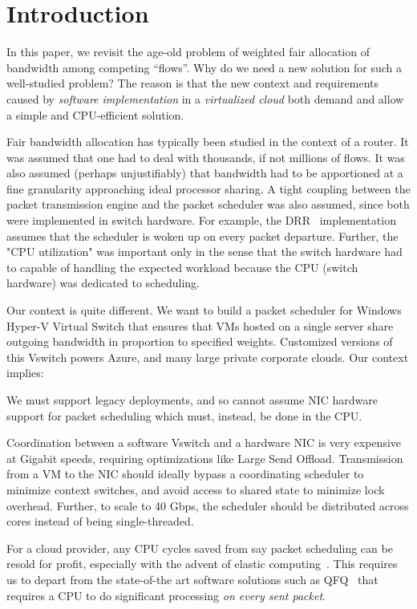 \section {Introduction}

In this paper, we revisit the age-old problem of weighted fair
allocation of bandwidth among competing ``flows''. Why do we need a new solution
for such a well-studied problem? The reason is that the new context and
requirements caused by {\em software implementation} in a {\em virtualized cloud}
both demand and allow a simple and CPU-efficient solution. 

Fair bandwidth allocation has typically been studied in the context of a router.
It was assumed that one had to deal with thousands, if not
millions of flows. It was also assumed (perhaps unjustifiably) that
bandwidth had to be apportioned at a fine granularity approaching ideal
processor sharing. A tight coupling between the packet transmission engine and
the packet scheduler was also assumed, since both were implemented in switch
hardware.  For example, the DRR~\cite{drr} implementation assumes that the
scheduler is woken up on every packet departure. Further, the "CPU utilization"
was important only in the sense that the switch hardware had to capable of
handling the expected workload because the CPU (switch hardware) was dedicated
to scheduling.

Our context is quite different. We want to build a packet scheduler for Windows
Hyper-V Virtual Switch that ensures that VMs hosted on a single server share outgoing
bandwidth in proportion to specified weights. Customized versions of this
Vswitch powers Azure, and many large private corporate clouds. Our context
implies:

 We must support legacy deployments, and so cannot assume NIC hardware support for
packet scheduling which must, instead, be done in the CPU.

 Coordination between a
software Vswitch and a hardware NIC is very expensive at Gigabit speeds, requiring optimizations
like Large Send Offload.  Transmission from a VM to the NIC
should ideally bypass a coordinating scheduler to
minimize context switches, and avoid access to shared state to minimize lock
overhead.  Further, to scale to 40 Gbps, the scheduler should be distributed
across cores instead of being single-threaded. 

 For a cloud provider, any CPU cycles saved from
say packet scheduling can be resold for profit, especially with the advent of
elastic computing~\cite{aws}.  This requires us to depart from the state-of-the
art software solutions such as QFQ~\cite{qfq} that requires a CPU to do
significant processing {\em on every sent packet}.

